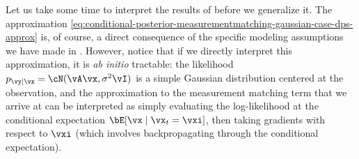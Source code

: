 \documentclass[../../book-main.tex]{subfiles}
\begin{document}
Let us take some time to interpret the results of
 before we generalize it.
The approximation
\eqref{eq:conditional-posterior-measurementmatching-gaussian-case-dps-approx}
is, of course, a direct consequence of the specific modeling assumptions we have
made in . However, notice
that if we directly interpret this approximation, it is \textit{ab initio}
tractable: the likelihood $p_{\vy \mid \vx} = \cN(\vA\vx, \sigma^2 \vI)$ is
a simple Gaussian distribution centered at the observation, and the
approximation to the measurement matching term that we arrive at can be
interpreted as simply evaluating the log-likelihood at the conditional
expectation $\bE[\vx \mid \vx_t = \vxi]$, then taking gradients with respect
to $\vxi$ (which involves backpropagating through the conditional expectation).
\end{document}
